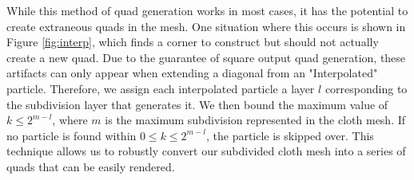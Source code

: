 \documentclass[sigconf]{acmart}
\begin{document}
While this method of quad generation works in most cases, it has the potential to create extraneous quads in the mesh. One situation where this occurs is shown in Figure \ref{fig:interp}, which finds a corner to construct but should not actually create a new quad. Due to the guarantee of square output quad generation, these artifacts can only appear when extending a diagonal from an "Interpolated" particle. Therefore, we assign each interpolated particle a layer $l$ corresponding to the subdivision layer that generates it. We then bound the maximum value of $k \leq 2^{m-l}$, where $m$ is the maximum subdivision represented in the cloth mesh. If no particle is found within $0\leq k \leq 2^{m-l}$, the particle is skipped over. This technique allows us to robustly convert our subdivided cloth mesh into a series of quads that can be easily rendered.
\end{document}
